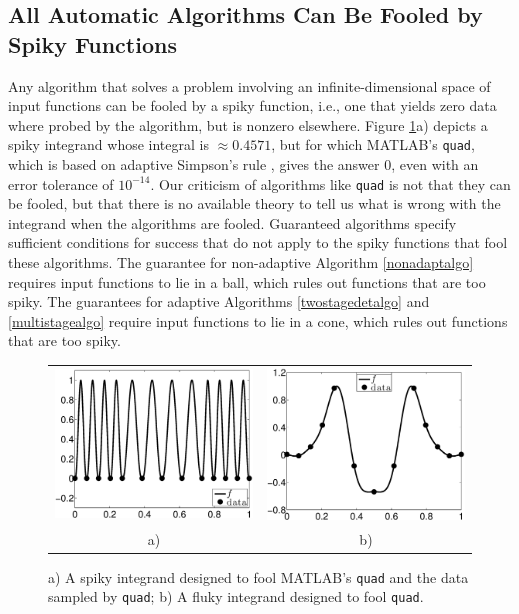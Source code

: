\documentclass[]{elsarticle}
\theoremstyle{definition}
\theoremstyle{remark}
\begin{document}
\subsection{All Automatic Algorithms Can Be Fooled by Spiky Functions}  

Any algorithm that solves a problem involving an infinite-dimensional space of input functions can be fooled by a spiky function, i.e., one that yields zero data where probed by the algorithm, but is nonzero elsewhere.   Figure \ref{fig:foolquad}a) depicts a spiky integrand whose integral is $\approx 0.4571$, but for which MATLAB's {\tt quad}, which is based on adaptive Simpson's rule  \cite{GanGau00a}, gives the answer $0$, even with an error tolerance of $10^{-14}$.  Our criticism of algorithms like {\tt quad} is not that they can be fooled, but that there is no available theory to tell us what is wrong with the integrand when the algorithms are fooled.  Guaranteed algorithms specify sufficient conditions for success that do not apply to the spiky functions that fool these algorithms.  The guarantee for non-adaptive Algorithm \ref{nonadaptalgo} requires input functions to lie in a ball, which rules out functions that are too spiky.  The guarantees for adaptive Algorithms \ref{twostagedetalgo} and \ref{multistagealgo} require input functions to lie in a cone, which rules out functions that are too spiky.

\begin{figure}
\centering 
\begin{tabular}{cc}
\includegraphics[width=5.5cm]{ConesPaperSpikyquad.eps}
&
\includegraphics[width=5.5cm]{ConesPaperFlukyquad.eps} \\
a) & b)
\end{tabular}
\caption{a) A spiky integrand designed to fool MATLAB's {\tt quad} and the data sampled by {\tt quad}; b) A fluky integrand designed to fool {\tt quad}. \label{fig:foolquad}}
\end{figure}
\end{document}
